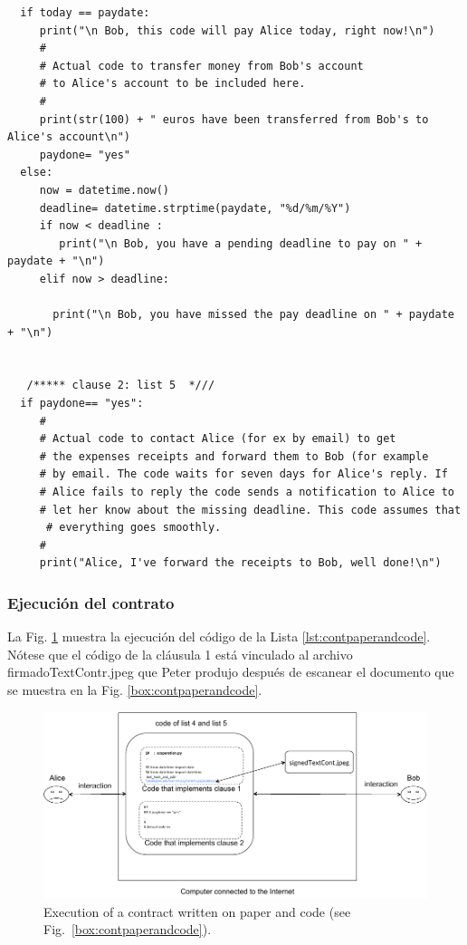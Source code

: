 \documentclass[12pt]{report} %
\begin{document}
\begin{lstlisting}
  if today == paydate:
     print("\n Bob, this code will pay Alice today, right now!\n")
     #
     # Actual code to transfer money from Bob's account
     # to Alice's account to be included here.
     #
     print(str(100) + " euros have been transferred from Bob's to Alice's account\n")
     paydone= "yes"
  else:
     now = datetime.now()
     deadline= datetime.strptime(paydate, "%d/%m/%Y")
     if now < deadline :
        print("\n Bob, you have a pending deadline to pay on " + paydate + "\n")
     elif now > deadline:

       print("\n Bob, you have missed the pay deadline on " + paydate + "\n")

   
   /***** clause 2: list 5  *///
  if paydone== "yes":
     #
     # Actual code to contact Alice (for ex by email) to get
     # the expenses receipts and forward them to Bob (for example
     # by email. The code waits for seven days for Alice's reply. If
     # Alice fails to reply the code sends a notification to Alice to
     # let her know about the missing deadline. This code assumes that
      # everything goes smoothly.
     #
     print("Alice, I've forward the receipts to Bob, well done!\n")
\end{lstlisting}




\subsubsection{Ejecución del contrato}

La Fig. \ref{fig:execontpaperandcode} muestra la ejecución del código de la Lista \ref{lst:contpaperandcode}. Nótese que el código de la cláusula 1 está vinculado al archivo firmadoTextContr.jpeg que Peter produjo después de escanear el documento que se muestra en la Fig. \ref{box:contpaperandcode}.

\begin{figure}
\centering
\includegraphics[width=0.98\columnwidth]{figures/execontpaperandcode.pdf}
\caption{Execution of a contract written on paper and code 
         (see Fig.~\ref{box:contpaperandcode}).}
\label{fig:execontpaperandcode}
\end{figure}
\end{document}
